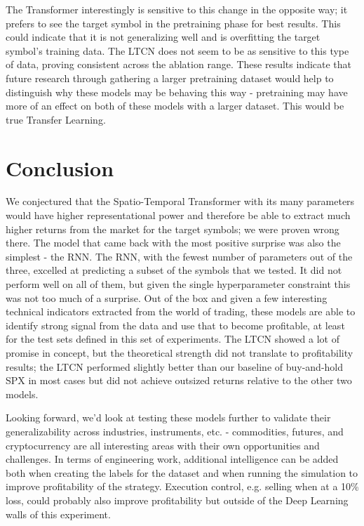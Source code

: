 \documentclass[10pt,twocolumn,letterpaper]{article}
\begin{document}
The Transformer interestingly is sensitive to this change in the opposite way; it prefers to see the target symbol in the pretraining phase for best results. This could indicate that it is not generalizing well and is overfitting the target symbol's training data. The LTCN does not seem to be as sensitive to this type of data, proving consistent across the ablation range. These results indicate that future research through gathering a larger pretraining dataset would help to distinguish why these models may be behaving this way - pretraining may have more of an effect on both of these models with a larger dataset. This would be true Transfer Learning.

\section{Conclusion}

We conjectured that the Spatio-Temporal Transformer with its many parameters would have higher representational power and therefore be able to extract much higher returns from the market for the target symbols; we were proven wrong there. The model that came back with the most positive surprise was also the simplest - the RNN. The RNN, with the fewest number of parameters out of the three, excelled at predicting a subset of the symbols that we tested. It did not perform well on all of them, but given the single hyperparameter constraint this was not too much of a surprise. Out of the box and given a few interesting technical indicators extracted from the world of trading, these models are able to identify strong signal from the data and use that to become profitable, at least for the test sets defined in this set of experiments. The LTCN showed a lot of promise in concept, but the theoretical strength did not translate to profitability results; the LTCN performed slightly better than our baseline of buy-and-hold SPX in most cases but did not achieve outsized returns relative to the other two models.

Looking forward, we’d look at testing these models further to validate their generalizability across industries, instruments, etc. - commodities, futures, and cryptocurrency are all interesting areas with their own opportunities and challenges. In terms of engineering work, additional intelligence can be added both when creating the labels for the dataset and when running the simulation to improve profitability of the strategy. Execution control, e.g. selling when at a 10\% loss, could probably also improve profitability but outside of the Deep Learning walls of this experiment.
\end{document}
